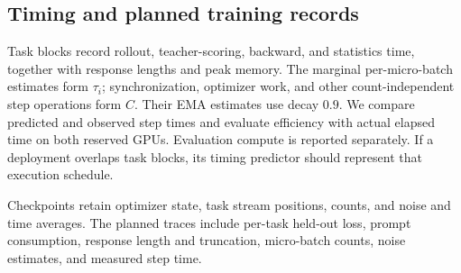 \subsection{Timing and planned training records}
\label{app:system_details}

Task blocks record rollout, teacher-scoring, backward, and statistics
time, together with response lengths and peak memory. The marginal
per-micro-batch estimates form $\tau_i$; synchronization, optimizer
work, and other count-independent step operations form $C$.
Their EMA estimates use decay $0.9$. We compare predicted and
observed step times and evaluate efficiency with actual elapsed
time on both reserved GPUs. Evaluation compute is reported separately.
If a deployment overlaps task blocks, its timing predictor should
represent that execution schedule.

Checkpoints retain optimizer state, task stream positions, counts,
and noise and time averages. The planned traces include per-task
held-out loss, prompt consumption, response length and truncation,
micro-batch counts, noise estimates, and measured step time.
